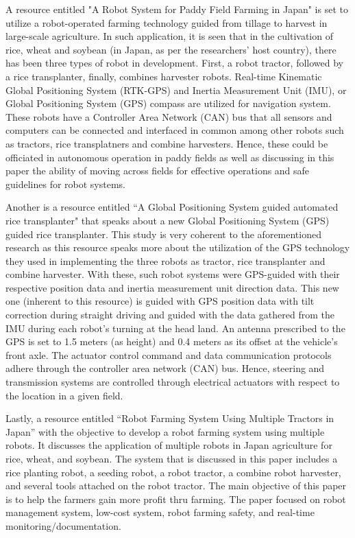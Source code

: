 A resource entitled "A Robot System for Paddy Field Farming in Japan" is set to utilize a robot-operated farming technology guided from tillage to harvest in large-scale agriculture. In such application, it is seen that in the cultivation of rice, wheat and soybean (in Japan, as per the researchers' host country), there has been three types of robot in development. First, a robot tractor, followed by a rice transplanter, finally, combines harvester robots. Real-time Kinematic Global Positioning System (RTK-GPS) and Inertia Measurement Unit (IMU), or Global Positioning System (GPS) compass are utilized for navigation system. These robots have a Controller Area Network (CAN) bus that all sensors and computers can be connected and interfaced in common among other robots such as tractors, rice transplatners and combine harvesters. Hence, these could be officiated in autonomous operation in paddy fields as well as discussing in this paper the ability of moving across fields for effective operations and safe guidelines for robot systems.

Another is a resource entitled “A Global Positioning System guided automated rice transplanter" that speaks about a new Global Positioning System (GPS) guided rice transplanter. This study is very coherent to the aforementioned research as this resource speaks more about the utilization of the GPS technology they used in implementing the three robots as tractor, rice transplanter and combine harvester. With these, such robot systems were GPS-guided with their respective position data and inertia measurement unit direction data. This new one (inherent to this resource) is guided with GPS position data with tilt correction during straight driving and guided with the data gathered from the IMU during each robot's turning at the head land. An antenna prescribed to the GPS is set to 1.5 meters (as height) and 0.4 meters as its offset at the vehicle's front axle. The actuator control command and data communication protocols adhere through the controller area network (CAN) bus. Hence, steering and transmission systems are controlled through electrical actuators with respect to the location in a given field.

Lastly, a resource entitled “Robot Farming System Using Multiple Tractors in Japan” with the objective to develop a robot farming system using multiple robots. It discusses the application of multiple robots in Japan agriculture for rice, wheat, and soybean. The system that is discussed in this paper includes a rice planting robot, a seeding robot, a robot tractor, a combine robot harvester, and several tools attached on the robot tractor. The main objective of this paper is to help the farmers gain more profit thru farming. The paper focused on robot management system, low-cost system, robot farming safety, and real-time monitoring/documentation.




